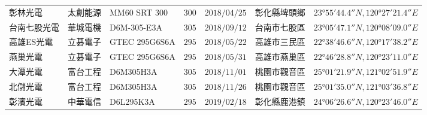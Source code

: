 \begin{table}[htp]
{\begin{minipage}[b][\textwidth][t]{\textheight}
\begin{tabular}{lllrlll}
      彰林光電                  & 太創能源                    & MM60 SRT 300      & $300$             & $2018/04/25$        & 彰化縣埤頭鄉  & $23°55'44.4″N, 120°27'21.4″E$ \\
      台南七股光電              & 華城電機                    & D6M-305-E3A       & $305$             & $2018/09/12$        & 台南市七股區  & $23°05'47.1″N, 120°08'09.0″E$ \\
      高雄ES光電                & 立碁電子                    & GTEC 295G6S6A     & $295$             & $2018/05/22$        & 高雄市三民區  & $22°38'46.6″N, 120°17'38.2″E$ \\
      燕巢光電                  & 立碁電子                    & GTEC 295G6S6A     & $295$             & $2018/05/31$        & 高雄市燕巢區  & $22°46'28.8″N, 120°23'11.0″E$ \\
      大潭光電                  & 富台工程                    & D6M305H3A         & $305$             & $2018/11/01$        & 桃園市觀音區  & $25°01'21.9″N, 121°02'51.9″E$ \\
      北儲光電                  & 富台工程                    & D6M305H3A         & $305$             & $2018/11/26$        & 桃園市觀音區  & $25°01'35.0″N, 121°03'36.8″E$ \\
      彰濱光電                  & 中華電信                    & D6L295K3A         & $295$             & $2019/02/18$        & 彰化縣鹿港鎮  & $24°06'26.6″N, 120°23'46.0″E$ \\
      \bottomrule
    \end{tabular}
\end{minipage}}
\end{table}

